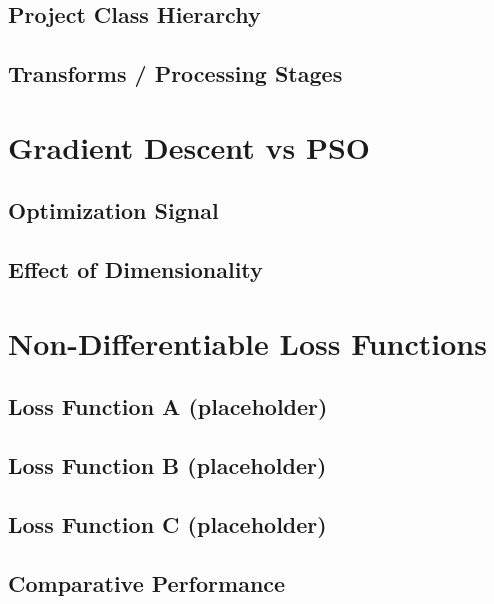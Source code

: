 \subsection{Project Class Hierarchy}

\subsection{Transforms / Processing Stages}

\section{Gradient Descent vs PSO}
\subsection{Optimization Signal}

\subsection{Effect of Dimensionality}

\section{Non-Differentiable Loss Functions}
\subsection{Loss Function A (placeholder)}

\subsection{Loss Function B (placeholder)}

\subsection{Loss Function C (placeholder)}

\subsection{Comparative Performance}

